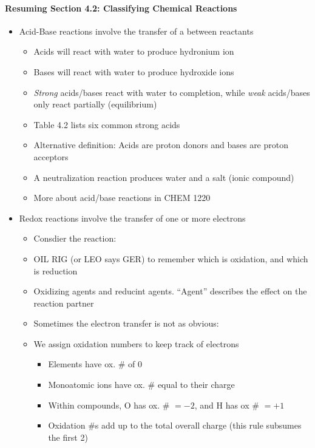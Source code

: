 \documentclass[12pt, openany, letterpaper]{memoir}
\begin{document}
\paragraph*{Resuming Section 4.2: Classifying Chemical Reactions}
\begin{itemize}
  \item Acid-Base reactions involve the transfer of a  between reactants
    \begin{itemize}
      \item Acids will react with water to produce hydronium ion
      \item Bases will react with water to produce hydroxide ions
      \item \emph{Strong} acids/bases react with water to completion, while \emph{weak} acids/bases only react partially (equilibrium)
      \item Table 4.2 lists six common strong acids
      \item Alternative definition: Acids are proton donors and bases are proton acceptors
      \item A neutralization reaction produces water and a salt (ionic compound)
      \item More about acid/base reactions in CHEM 1220
    \end{itemize}
  \item Redox reactions involve the transfer of one or more electrons
    \begin{itemize}
      \item Consdier the reaction: 
      \item OIL RIG (or LEO says GER) to remember which is oxidation, and which is reduction
      \item Oxidizing agents and reducint agents. ``Agent'' describes the effect on the reaction partner
      \item Sometimes the electron transfer is not as obvious: 
      \item We assign oxidation numbers to keep track of electrons
        \begin{itemize}
          \item Elements have ox. \# of $0$
          \item Monoatomic ions have ox. \# equal to their charge
          \item Within compounds, O has ox. \# $=-2$, and H has ox \# $=+1$
          \item Oxidation \#s add up to the total overall charge (this rule subsumes the first 2)

\end{itemize}
\end{itemize}
\end{itemize}
\end{document}
